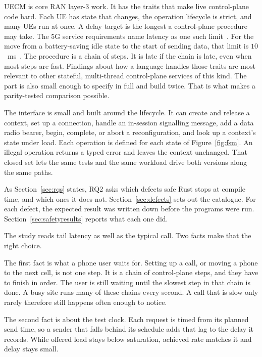 \documentclass[english,oneside,a4paper,censored,csm,software-track-2020]{HYthesisML}
\begin{document}
UECM is core RAN layer-3 work. It has the traits that make live control-plane
code hard. Each UE has state that changes, the operation lifecycle is strict,
and many UEs run at once. A delay target is the longest a control-plane procedure may take.
The 5G service requirements name latency as one such limit~\cite{3gpp22261}.
For the move from a battery-saving idle state to the start of sending data, that limit is $10$~ms~\cite{3gpp38913}.
The procedure is a chain of steps. It is late if the chain is late, even when most steps are fast.
Findings about how a language
handles those traits are most relevant to other stateful, multi-thread
control-plane services of this kind. The part is also small enough to specify in full and build twice.
That is what makes a parity-tested comparison possible.

The interface is small and built around the lifecycle. It can create and
release a context, set up a connection, handle an in-session signalling
message, add a data radio bearer, begin, complete, or abort a
reconfiguration, and look up a context's state under load. Each
operation is defined for each state of Figure~\ref{fig:fsm}. An illegal operation
returns a typed error and leaves the context unchanged. That closed set lets
the same tests and the same workload drive both versions along the same
paths.

As Section~\ref{sec:rqs} states, RQ2 asks which defects safe Rust stops at compile
time, and which ones it does not. Section~\ref{sec:defects} sets out the catalogue. For each defect, the expected
result was written down before the programs were run.
Section~\ref{sec:safetyresults} reports what each one did.

The study reads tail latency as well as the typical call. Two facts make that the right
choice.

The first fact is what a phone user waits for. Setting up a call, or moving a phone to the
next cell, is not one step. It is a chain of control-plane steps, and they have to finish in
order. The user is still waiting until the slowest step in that chain is done. A busy site
runs many of these chains every second. A call that is slow only rarely therefore still
happens often enough to notice.

The second fact is about the test clock. Each request is timed from its planned send time, so
a sender that falls behind its schedule adds that lag to the delay it records. While offered
load stays below saturation, achieved rate matches it and delay stays small.
\end{document}
